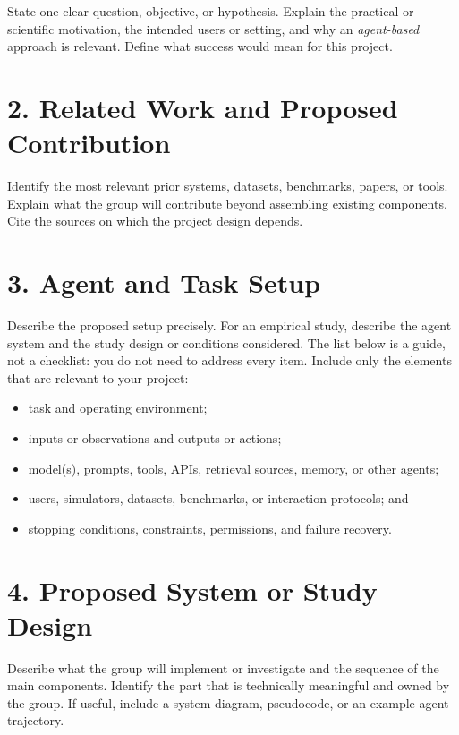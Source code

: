 \documentclass[11pt]{article}
\begin{document}
State one clear question, objective, or hypothesis. Explain the practical or
scientific motivation, the intended users or setting, and why an \emph{agent-based}
approach is relevant. Define what success would mean for this project.

\section*{2. Related Work and Proposed Contribution}

Identify the most relevant prior systems, datasets, benchmarks, papers, or tools.
Explain what the group will contribute beyond assembling existing components.
Cite the sources on which the project design depends.

\section*{3. Agent and Task Setup}

Describe the proposed setup precisely. For an empirical study, describe the agent
system and the study design or conditions considered. The list below is a guide,
not a checklist: you do not need to address every item. Include only the elements
that are relevant to your project:

\begin{itemize}[leftmargin=*,itemsep=0.25em]
    \item task and operating environment;
    \item inputs or observations and outputs or actions;
    \item model(s), prompts, tools, APIs, retrieval sources, memory, or other agents;
    \item users, simulators, datasets, benchmarks, or interaction protocols; and
    \item stopping conditions, constraints, permissions, and failure recovery.
\end{itemize}

\section*{4. Proposed System or Study Design}

Describe what the group will implement or investigate and the sequence of the main
components. Identify the part that is technically meaningful and owned by the group.
If useful, include a system diagram, pseudocode, or an example agent trajectory.
\end{document}
